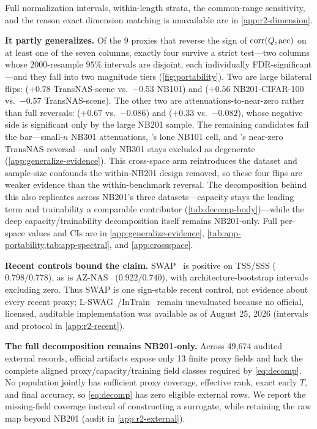 \noindent Full normalization intervals, within-length strata, the common-range
sensitivity, and the reason exact dimension matching is unavailable are in
\cref{app:r2-dimension}.

\noindent\textbf{It partly generalizes.}\label{sec:generalize}\label{find:generalize}{}
Of the $9$ proxies that reverse the sign of $\operatorname{corr}(Q,\mathrm{acc})$ on at least one of the
seven columns, exactly four survive a strict test---two columns whose
$2000$-resample $95\%$ intervals are disjoint, each individually FDR-significant---and
they fall into two magnitude tiers (\cref{fig:portability}). Two are large
bilateral flips:  ($+0.78$ TransNAS-scene vs.\ $-0.53$ NB101) and
 ($+0.56$ NB201-CIFAR-100 vs.\ $-0.57$ TransNAS-scene). The other two are
attenuations-to-near-zero rather than full reversals:  ($+0.67$ vs.\
$-0.086$) and  ($+0.33$ vs.\ $-0.082$), whose negative side is significant
only by the large NB201 sample. The remaining candidates fail the bar---small-$n$
NB301 attenuations, \px{epe-nas}'s lone NB101 cell, and \px{flops}'s near-zero TransNAS
reversal---and only NB301 stays excluded as degenerate
(\cref{app:generalize-evidence}). This cross-space arm reintroduces the dataset and
sample-size confounds the within-NB201 design removed, so these four flips are
weaker evidence than the within-benchmark reversal. The decomposition behind this
also replicates across NB201's three datasets---capacity stays the leading term and
trainability a comparable contributor (\cref{tab:decomp-body})---while the deep
capacity/trainability decomposition itself remains NB201-only. Full per-space
values and CIs are in \cref{app:generalize-evidence},
\cref{tab:app-portability,tab:app-spectral}, and \cref{app:crossspace}.

\noindent\textbf{Recent controls bound the claim.}
SWAP~\cite{peng2024swap} is positive on TSS/SSS ($0.798/0.778$), as is
AZ-NAS~\cite{aznas2024} ($0.922/0.740$),
with architecture-bootstrap intervals excluding zero. Thus SWAP is one
sign-stable recent control, not evidence about every recent proxy;
L-SWAG~\cite{casarin2025lswag}/InTrain~\cite{intrain2026}
remain unevaluated because no official, licensed, auditable implementation was
available as of August 25, 2026 (intervals and protocol in
\cref{app:r2-recent}).

\noindent\textbf{The full decomposition remains NB201-only.}
Across 49,674 audited external records, official artifacts expose only 13 finite
proxy fields and lack the complete aligned proxy/capacity/training field classes
required by \cref{eq:decomp}. No population jointly has sufficient proxy
coverage, effective rank, exact early $T$, and final accuracy, so
\cref{eq:decomp} has zero eligible external rows. We report the missing-field
coverage instead of constructing a surrogate, while retaining the raw map beyond
NB201 (audit in \cref{app:r2-external}).

